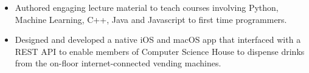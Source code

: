 \documentclass[10pt,letter,ragged2e]{altacv}
\begin{document}
\divider

\begin{itemize}
    \item Authored engaging lecture material to teach courses involving Python, Machine Learning, C++, Java and Javascript to first time programmers. 
\end{itemize}

\divider







\begin{itemize}
  \item Designed and developed a native iOS and macOS app that interfaced with a REST API to enable members of Computer Science House to dispense drinks from the on-floor internet-connected vending machines. 
\end{itemize}
%

\clearpage
\end{document}
